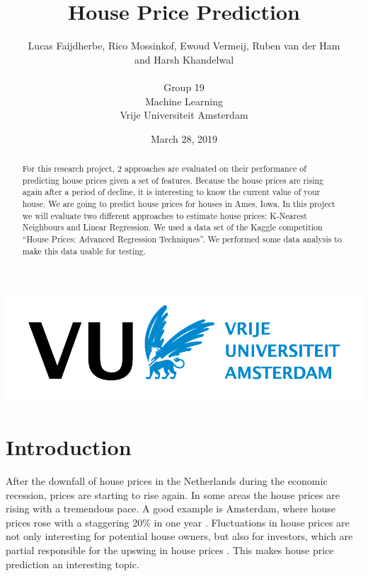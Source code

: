 \documentclass[a4paper,11pt]{article}
\title{House Price Prediction}
\date{March 28, 2019}
\author{Lucas Faijdherbe, Rico Mossinkof, Ewoud Vermeij, Ruben van der Ham\\ and Harsh Khandelwal\\\\
Group 19\\
\small Machine Learning\\
\small Vrije Universiteit Amsterdam}
\begin{document}
\begin{titlepage}

\centering
\maketitle
\includegraphics[width=0.8\linewidth]{images/vulogo.png}
\hfill
\\


\begin{abstract}
For this research project, 2 approaches are evaluated on their performance of predicting house prices given a set of features. Because the house prices are rising again after a period of decline, it is interesting to know the current value of your house. We are going to predict house prices for houses in Ames, Iowa.
    In this project we will evaluate two different approaches to estimate house prices: K-Nearest Neighbours and Linear Regression. We used a data set of the Kaggle competition “House Prices: Advanced Regression Techniques”. We performed some data analysis to make this data usable for testing. 
\end{abstract}
\end{titlepage}



\clearpage
{} %


\section{Introduction}
After the downfall of house prices in the Netherlands during the economic recession, prices are starting to rise again. In some areas the house prices are rising with a tremendous pace. A good example is Amsterdam, where house prices rose with a staggering 20\% in one year \cite{couzy_damen_2018}. Fluctuations in house prices are not only interesting for potential house owners, but also for investors, which are partial responsible for the upswing in house prices \cite{couzy_2018}. This makes house price prediction an interesting topic.\\
\end{document}
